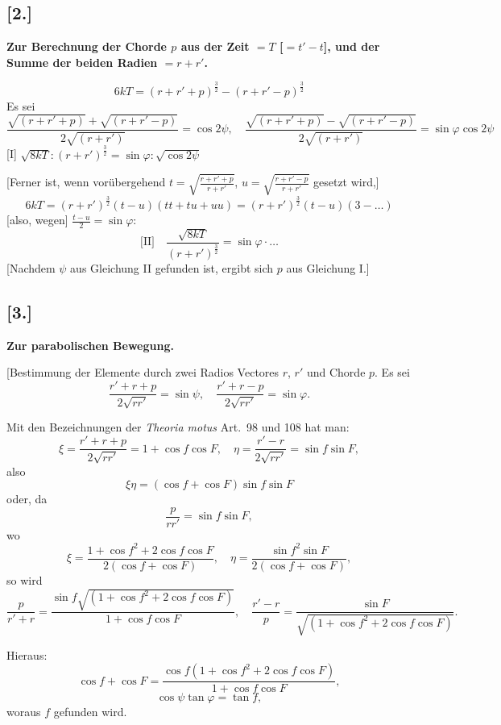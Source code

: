 \documentclass[12pt,a4paper]{article}
\begin{document}
\subsection*{[2.]}
\textbf{Zur Berechnung der Chorde $p$ aus der Zeit $= T$ [$= t' - t$], und der Summe
der beiden Radien $= r + r'$.}

\[
6kT = (r + r' + p)^{\frac{3}{2}} - (r + r' - p)^{\frac{3}{2}}
\]
Es sei
\[
\frac{\sqrt{(r + r' + p)} + \sqrt{(r + r' - p)}}{2\sqrt{(r + r')}} = \cos 2\psi, \quad \frac{\sqrt{(r + r' + p)} - \sqrt{(r + r' - p)}}{2\sqrt{(r + r')}} = \sin\varphi\cos 2\psi
\]
[I] $\sqrt{8kT} : (r + r')^{\frac{3}{2}} = \sin\varphi : \sqrt{\cos 2\psi}$

[Ferner ist, wenn vor\"ubergehend $t = \sqrt{\frac{r + r' + p}{r + r'}}$, $u = \sqrt{\frac{r + r' - p}{r + r'}}$ gesetzt wird,]
\[
6kT = (r + r')^{\frac{3}{2}}(t - u)(tt + tu + uu) = (r + r')^{\frac{3}{2}}(t - u)(3 - \ldots)
\]
[also, wegen] $\frac{t - u}{2} = \sin\varphi$:
\[
\text{[II]} \quad \frac{\sqrt{8kT}}{(r + r')^{\frac{3}{2}}} = \sin\varphi \cdot \ldots
\]
[Nachdem $\psi$ aus Gleichung II gefunden ist, ergibt sich $p$ aus Gleichung I.]

\subsection*{[3.]}
\textbf{Zur parabolischen Bewegung.}

[Bestimmung der Elemente durch zwei Radios Vectores $r$, $r'$ und Chorde $p$.
Es sei
\begin{equation}\tag{1}
\frac{r' + r + p}{2\sqrt{rr'}} = \sin\psi, \quad \frac{r' + r - p}{2\sqrt{rr'}} = \sin\varphi.
\end{equation}

\newpage

Mit den Bezeichnungen der \textit{Theoria motus} Art.~98 und 108 hat man:
\[
\xi = \frac{r' + r + p}{2\sqrt{rr'}} = 1 + \cos f\cos F, \quad \eta = \frac{r' - r}{2\sqrt{rr'}} = \sin f\sin F,
\]
also
\[
\xi\eta = (\cos f + \cos F)\sin f\sin F
\]
oder, da
\[
\frac{p}{rr'} = \sin f\sin F,
\]
wo
\[
\xi = \frac{1 + \cos f^2 + 2\cos f\cos F}{2(\cos f + \cos F)}, \quad \eta = \frac{\sin f^2\sin F}{2(\cos f + \cos F)},
\]
so wird
\[
\frac{p}{r' + r} = \frac{\sin f\sqrt{(1 + \cos f^2 + 2\cos f\cos F)}}{1 + \cos f\cos F}, \quad \frac{r' - r}{p} = \frac{\sin F}{\sqrt{(1 + \cos f^2 + 2\cos f\cos F)}}.
\]

Hieraus:
\[
\cos f + \cos F = \frac{\cos f(1 + \cos f^2 + 2\cos f\cos F)}{1 + \cos f\cos F},
\]
\[
\cos\psi\tan\varphi = \tan f,
\]
woraus $f$ gefunden wird.
\end{document}
